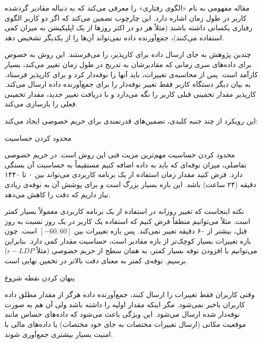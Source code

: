 
مقاله مفهومی به نام «الگوی رفتاری» را معرفی می‌کند که به دنباله مقادیر گردشده کاربر در طول زمان اشاره دارد. این چارچوب تضمین می‌کند که اگر دو کاربر الگوی رفتاری یکسانی داشته باشند (مثلاً هر دو در اکثر روزها از یک اپلیکیشن به میزان کمی استفاده می‌کنند)، جمع‌آورنده داده نمی‌تواند آن‌ها را از یکدیگر تشخیص دهد.



چندین پژوهش به جای ارسال داده برای کارپذیر،  را می‌فرستند. این روش به خصوص برای داده‌های سری زمانی که مقادیرشان به تدریج در طول زمان تغییر می‌کند، بسیار کارآمد است. پس از محاسبه‌ی تغییرات، باید آنها را نوفه‌دار کرد و برای کارپذیر فرستاد. به بیان دیگر دستگاه کاربر فقط تغییر نوفه‌دار را برای جمع‌آورنده داده ارسال می‌کند. کارپذیر مقدار تخمینی قبلی کاربر را نگه می‌دارد و با دریافت تغییر جدید، مقدار تخمینی فعلی را بازسازی می‌کند.

این رویکرد از چند جنبه کلیدی، تضمین‌های قدرتمندی برای حریم خصوصی ایجاد می‌کند:


 محدود کردن حساسیت

محدود کردن حساسیت مهم‌ترین مزیت فنی این روش است. در حریم خصوصی تفاضلی، میزان نوفه‌ای که باید به داده اضافه کنیم مستقیماً به حساسیت آن بستگی دارد. فرض کنید مقدار زمان استفاده از یک برنامه کاربردی می‌تواند بین ۰ تا ۱۴۴۰ دقیقه (۲۴ ساعت) باشد. این بازه بسیار بزرگ است و برای پوشش آن به نوفه‌ی زیادی نیاز داریم که دقت را کاهش می‌دهد.

نکته اینجاست که تغییر روزانه در استفاده از یک برنامه کاربردی معمولاً بسیار کمتر است. مثلاً می‌توانیم منطقاً فرض کنیم که استفاده یک کاربر در یک روز نسبت به روز قبل، بیشتر از ۶۰ دقیقه تغییر نمی‌کند. پس بازه تغییرات بین $[-60, 60]$ است. چون بازه تغییرات بسیار کوچک‌تر از بازه مقادیر است، حساسیت مقدار کمی دارد. بنابراین می‌توانیم با افزودن نوفه بسیار کمتر، به همان سطح از حریم خصوصی (مثلاً $\epsilon{-}LDP$) برسیم. نوفه‌ی کمتر به معنای دقت بالاتر در تخمین نهایی است.

 پنهان کردن نقطه شروع

وقتی کاربران فقط تغییرات را ارسال کنند، جمع‌آورنده داده هرگز از مقدار مطلق داده کاربران باخبر نمی‌شود. مگر اینکه مقدار اولیه را داشته باشد ولی آن هم به صورت نوفه‌دار شده ارسال می‌شود. این ویژگی باعث می‌شود که داده‌های حساس مانند موقعیت مکانی (ارسال تغییرات مختصات به جای خود مختصات) یا داده‌های مالی با امنیت بسیار بیشتری جمع‌آوری شوند.


